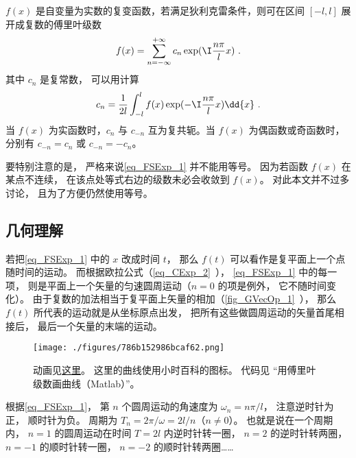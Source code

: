 
$f(x)$ 是自变量为实数的复变函数，若满足狄利克雷条件，则可在区间 $[- l,l]$ 展开成复数的傅里叶级数
\begin{equation}\label{eq_FSExp_1}
f(x) = \sum_{n =  - \infty }^{ + \infty } c_n \exp ( \I\frac{n\pi }{l}x )~.
\end{equation}
其中 $c_n$ 是复常数， 可以用计算
\begin{equation}\label{eq_FSExp_2}
c_n = \frac{1}{2l} \int_{ - l}^l  f(x)\exp( -\I\frac{n\pi }{l}x ) \dd{x} ~.
\end{equation}
当 $f(x)$ 为实函数时，$c_n$ 与 $c_{-n}$ 互为复共轭。当 $f(x)$ 为偶函数或奇函数时，分别有 $c_{-n} = c_n$ 或 $c_{-n} = -c_n$。

要特别注意的是， 严格来说\autoref{eq_FSExp_1} 并不能用等号。 因为若函数 $f(x)$ 在某点不连续， 在该点处等式右边的级数未必会收敛到 $f(x)$。 对此本文并不过多讨论， 且为了方便仍然使用等号。

\subsection{几何理解}
若把\autoref{eq_FSExp_1} 中的 $x$ 改成时间 $t$， 那么 $f(t)$ 可以看作是复平面上一个点随时间的运动。 而根据欧拉公式（\autoref{eq_CExp_2}~）， \autoref{eq_FSExp_1} 中的每一项， 则是平面上一个矢量的匀速圆周运动（$n=0$ 的项是例外， 它不随时间变化）。 由于复数的加法相当于复平面上矢量的相加（\autoref{fig_GVecOp_1}~）， 那么 $f(t)$ 所代表的运动就是从坐标原点出发， 把所有这些做圆周运动的矢量首尾相接后， 最后一个矢量的末端的运动。

\begin{figure}[ht]
\centering
\texttt{[image: ./figures/786b152986bcaf62.png]}
\caption{动画见\href{https://wuli.wiki/apps/FFTplt.html}{这里}。 这里的曲线使用小时百科的图标。 代码见 “用傅里叶级数画曲线（Matlab）”。} \label{fig_FSExp_1}
\end{figure}

根据\autoref{eq_FSExp_1}， 第 $n$ 个圆周运动的角速度为 $\omega_n = n\pi/l$， 注意逆时针为正， 顺时针为负。 周期为 $T_n = 2\pi/\omega = 2l/n$（$n\ne 0$）。 也就是说在一个周期内， $n=1$ 的圆周运动在时间 $T = 2l$ 内逆时针转一圈， $n=2$ 的逆时针转两圈， $n=-1$ 的顺时针转一圈， $n=-2$ 的顺时针转两圈……

